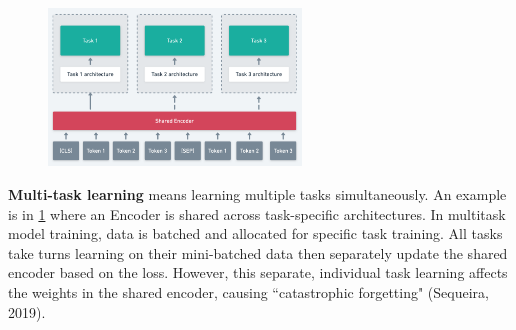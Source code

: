 \begin{program}
\begin{figure}
\begin{center}
    \includegraphics[width=0.6\textwidth]{imgs/multitaskExample.png}
\end{center}
\label{fig:multitaskexample}
\end{figure}

\textbf{Multi-task learning} means learning multiple tasks simultaneously. An example is in \cref{fig:multitaskexample} where an Encoder is shared across task-specific architectures. In multitask model training, data is batched and allocated for specific task training. All tasks take turns learning on their mini-batched data then separately update the shared encoder based on the loss. However, this separate, individual task learning affects the weights in the shared encoder, causing ``catastrophic forgetting" (Sequeira, 2019). 

\end{program}




